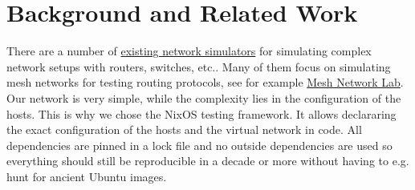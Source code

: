 
\chapter{Background and Related Work}


There are a number of \href{https://brianlinkletter.com/2023/02/network-emulators-and-network-simulators-2023/}{existing network simulators} for simulating complex network setups with routers, switches, etc.. Many of them focus on simulating mesh networks for testing routing protocols, see for example \href{https://github.com/mwarning/meshnet-lab}{Mesh Network Lab}. Our network is very simple, while the complexity lies in the configuration of the hosts. This is why we chose the NixOS testing framework. It allows declararing the exact configuration of the hosts and the virtual network in code. All dependencies are pinned in a lock file and no outside dependencies are used so everything should still be reproducible in a decade or more without having to e.g. hunt for ancient Ubuntu images.
